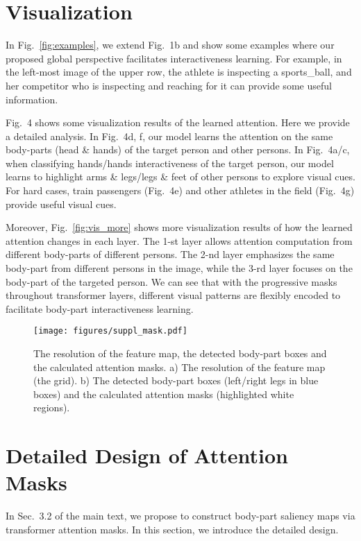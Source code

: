 \documentclass[runningheads]{llncs}
\begin{document}
\section{Visualization}
In Fig.~\ref{fig:examples}, we extend Fig.~1b and show some examples where our proposed global perspective facilitates interactiveness learning. For example, in the left-most image of the upper row, the athlete is inspecting a sports\_ball, and her competitor who is inspecting and reaching for it can provide some useful information. 

Fig.~4 shows some visualization results of the learned attention. Here we provide a detailed analysis.
In Fig.~4d, f, our model learns the attention on the same body-parts (head \& hands) of the target person and other persons.
In Fig.~4a/c, when classifying hands/hands interactiveness of the target person, our model learns to highlight arms \& legs/legs \& feet of other persons to explore visual cues.
For hard cases, train passengers (Fig.~4e) and other athletes in the field (Fig.~4g) provide useful visual cues.

Moreover, Fig.~\ref{fig:vis_more} shows more visualization results of how the learned attention changes in each layer. The 1-st layer allows attention computation from different body-parts of different persons. The 2-nd layer emphasizes the same body-part from different persons in the image, while the 3-rd layer focuses on the body-part of the targeted person. We can see that with the progressive masks throughout transformer layers, different visual patterns are flexibly encoded to facilitate body-part interactiveness learning.

\begin{figure}
\centering
\texttt{[image: figures/suppl\_mask.pdf]}
\caption{The resolution of the feature map, the detected body-part boxes and the calculated attention masks. a) The resolution of the feature map (the grid). b) The detected body-part boxes (left/right legs in blue boxes) and the calculated attention masks (highlighted white regions).}
\label{fig:masks}
\end{figure}

\section{Detailed Design of Attention Masks}
In Sec.~3.2 of the main text, we propose to construct body-part saliency maps via transformer attention masks.
In this section, we introduce the detailed design.
\end{document}
